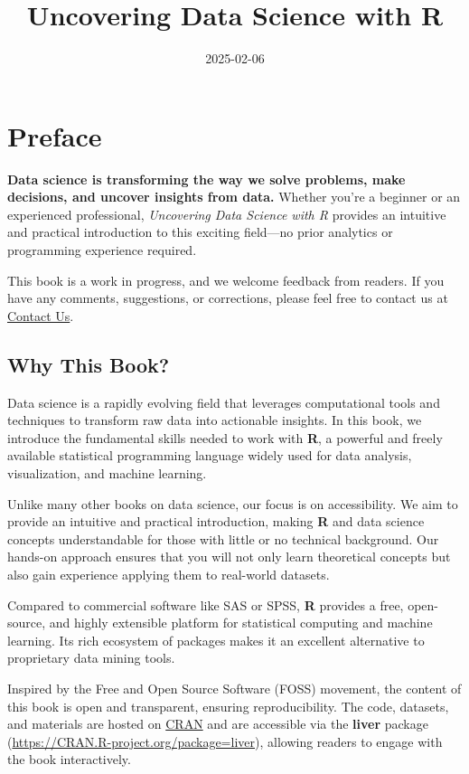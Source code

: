 \documentclass[
]{book}
\title{Uncovering Data Science with R}
\author{}
\date{\vspace{-2.5em}2025-02-06}
\theoremstyle{definition}
\theoremstyle{definition}
\theoremstyle{definition}
\theoremstyle{definition}
\theoremstyle{remark}
\begin{document}
\maketitle

{
\setcounter{tocdepth}{1}
\tableofcontents
}
\chapter*{Preface}\label{preface}

\textbf{Data science is transforming the way we solve problems, make decisions, and uncover insights from data.} Whether you're a beginner or an experienced professional, \emph{Uncovering Data Science with R} provides an intuitive and practical introduction to this exciting field---no prior analytics or programming experience required.

This book is a work in progress, and we welcome feedback from readers. If you have any comments, suggestions, or corrections, please feel free to contact us at \href{mailto:a.mohammadi@uva.nl}{Contact Us}.

\section*{Why This Book?}\label{why-this-book}

Data science is a rapidly evolving field that leverages computational tools and techniques to transform raw data into actionable insights. In this book, we introduce the fundamental skills needed to work with \textbf{R}, a powerful and freely available statistical programming language widely used for data analysis, visualization, and machine learning.

Unlike many other books on data science, our focus is on accessibility. We aim to provide an intuitive and practical introduction, making \textbf{R} and data science concepts understandable for those with little or no technical background. Our hands-on approach ensures that you will not only learn theoretical concepts but also gain experience applying them to real-world datasets.

Compared to commercial software like SAS or SPSS, \textbf{R} provides a free, open-source, and highly extensible platform for statistical computing and machine learning. Its rich ecosystem of packages makes it an excellent alternative to proprietary data mining tools.

Inspired by the Free and Open Source Software (FOSS) movement, the content of this book is open and transparent, ensuring reproducibility. The code, datasets, and materials are hosted on \href{https://cran.r-project.org/web/packages/liver/index.html}{CRAN} and are accessible via the \textbf{liver} package (\url{https://CRAN.R-project.org/package=liver}), allowing readers to engage with the book interactively.
\end{document}
